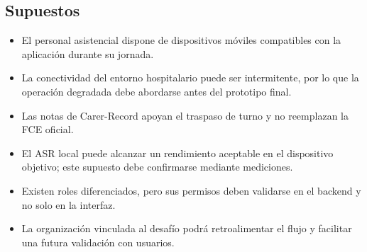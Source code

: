 \subsection{Supuestos}

\begin{itemize}
    \item El personal asistencial dispone de dispositivos móviles compatibles con la aplicación durante su jornada.
    \item La conectividad del entorno hospitalario puede ser intermitente, por lo que la operación degradada debe abordarse antes del prototipo final.
    \item Las notas de Carer-Record apoyan el traspaso de turno y no reemplazan la FCE oficial.
    \item El ASR local puede alcanzar un rendimiento aceptable en el dispositivo objetivo; este supuesto debe confirmarse mediante mediciones.
    \item Existen roles diferenciados, pero sus permisos deben validarse en el backend y no solo en la interfaz.
    \item La organización vinculada al desafío podrá retroalimentar el flujo y facilitar una futura validación con usuarios.
\end{itemize}
